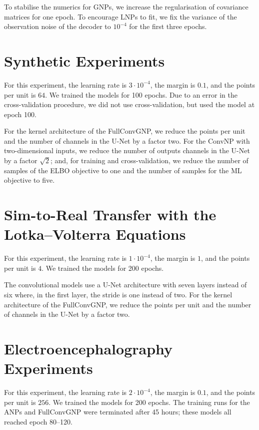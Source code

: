 \documentclass[12pt]{report}
\begin{document}
To stabilise the numerics for GNPs, we increase the regularisation of covariance matrices for one epoch.
To encourage LNPs to fit, we fix the variance of the observation noise of the decoder to $10^{-4}$ for the first three epochs.

\section{Synthetic Experiments}
\label{sec:experimental_details:synthetic}

For this experiment,
the learning rate is $3\cdot10^{-4}$,
the margin is $0.1$,
and the points per unit is $64$.
We trained the models for 100 epochs.
Due to an error in the cross-validation procedure, we did not use cross-validation, but used the model at epoch 100.

For the kernel architecture of the FullConvGNP, we reduce the points per unit and the number of channels in the U-Net by a factor two.
For the ConvNP with two-dimensional inputs, we reduce the number of outputs channels in the U-Net by a factor $\sqrt{2}$; and, for training and cross-validation, we reduce the number of samples of the ELBO objective to one and the number of samples for the ML objective to five.

\section{Sim-to-Real Transfer with the Lotka--Volterra Equations}
\label{sec:experimental_details:predprey}

For this experiment,
the learning rate is $1\cdot10^{-4}$,
the margin is $1$,
and the points per unit is $4$.
We trained the models for 200 epochs.

The convolutional models use a U-Net architecture with seven layers instead of six
where, in the first layer, the stride is one instead of two.
For the kernel architecture of the FullConvGNP, we reduce the points per unit and the number of channels in the U-Net by a factor two.

\section{Electroencephalography Experiments}
\label{sec:experimental_details:eeg}

For this experiment,
the learning rate is $2\cdot10^{-4}$,
the margin is $0.1$,
and the points per unit is $256$.
We trained the models for 200 epochs.
The training runs for the ANPs and FullConvGNP were terminated after 45 hours;
these models all reached epoch 80--120.
\end{document}
